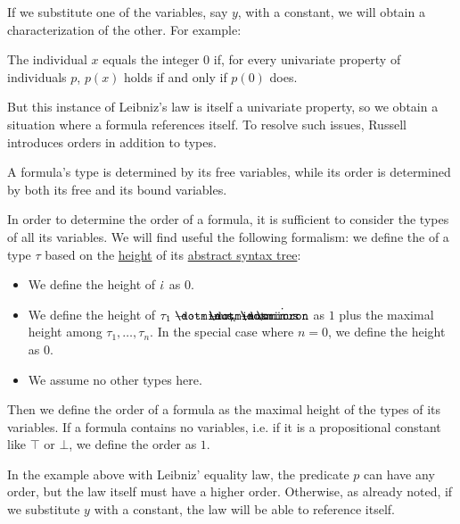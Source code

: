 \begin{concept}
\begin{thmenum}
    If we substitute one of the variables, say \( y \), with a constant, we will obtain a characterization of the other. For example:
    \begin{displayquote}
      The individual \( x \) equals the integer \( 0 \) if, for every univariate property of individuals \( p \), \( p(x) \) holds if and only if \( p(0) \) does.
    \end{displayquote}

    But this instance of Leibniz's law is itself a univariate property, so we obtain a situation where a formula references itself. To resolve such issues, Russell introduces orders in addition to types.

     A formula's type is determined by its free variables, while its order is determined by both its free and its bound variables.

    In order to determine the order of a formula, it is sufficient to consider the types of all its variables. We will find useful the following formalism: we define the  of a type \( \tau \) based on the \hyperref[def:rooted_tree/height]{height} of its \hyperref[def:simple_type_ast]{abstract syntax tree}:
    \begin{itemize}
      \item We define the height of \( \dot{\iota} \) as \( 0 \).
      \item We define the height of \( \tau_1 \synimplies \cdots \synimplies \tau_n \synimplies \syn\omicron \) as \( 1 \) plus the maximal height among \( \tau_1, \ldots, \tau_n \). In the special case where \( n = 0 \), we define the height as \( 0 \).
      \item We assume no other types here.
    \end{itemize}

    Then we define the order of a formula as the maximal height of the types of its variables. If a formula contains no variables, i.e. if it is a propositional constant like \( \top \) or \( \bot \), we define the order as \( 1 \).

    In the example above with Leibniz' equality law, the predicate \( p \) can have any order, but the law itself must have a higher order. Otherwise, as already noted, if we substitute \( y \) with a constant, the law will be able to reference itself.


\end{thmenum}
\end{concept}
